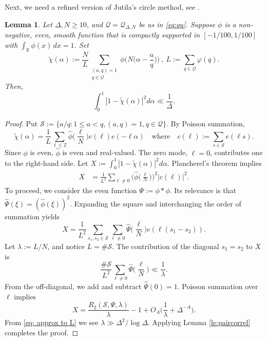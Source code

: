 \documentclass[12pt,reqno]{amsart}
\theoremstyle{plain}
\newtheorem{lemma}{Lemma}
\numberwithin{equation}{section}
\numberwithin{figure}{section}
\theoremstyle{plain}
\theoremstyle{definition}
\theoremstyle{remark}
\begin{document}
Next, we need a refined version of Jutila's circle method,
see \cite{Mayank}. 
\begin{lemma} \label{le:mayank}
  Let $\Delta, N \geq 10$, 
  and $\mathcal{Q}=\mathcal{Q}_{\Delta,N}$ be as in \eqref{eq:qu}.
  Suppose $\phi$
  is a non-negative, even, smooth function that is
  compactly supported in $[-1 / 100,1 / 100]$ with 
  $\int_{\mathbb{R}} \phi (x) \,dx = 1$. Set
  $$
  \widetilde{\chi}(\alpha) := \frac{N}{L}
  \sum_{\substack{(a,q) = 1 \\ q \in \mathcal{Q}}} 
  \phi \Big ( N 
  \Big ( \alpha - \frac{a}{q} \Big ) \Big ) \ , 
  \ L := \sum_{q \in \mathcal{Q}} \varphi(q). 
  $$
  Then,
  $$
  \int_{0}^{1} |1 - \widetilde{\chi}(\alpha)|^2 
  d \alpha 
  \ll \frac{1}{\Delta}.
  $$
\end{lemma}
\begin{proof}
Put $\mathcal{S}:=\{a/q: 
  1\leq a < q, (a,q)=1, q\in \mathcal{Q}\}$.
By Poisson summation, 
$$\widetilde{\chi}(\alpha) = 
\frac{1}{L}\sum_{\ell \in \mathbb{Z}} 
\widehat{\phi}\Big ( \frac{\ell}{N} \Big ) 
c(\ell) e( - \ell \alpha) 
\quad \mathrm{where}
\quad 
c(\ell) := \sum_{s\in \mathcal{S}} 
e ( \ell s ).
$$
Since $\phi$ is even, $\widehat{\phi}$ is even and real-valued.
The zero mode, $\ell=0$, contributes one to the right-hand side.
Let $X:=\int_{0}^{1} | 1 - \widetilde{\chi}(\alpha) |^2 
d \alpha $. Plancherel's theorem implies 
\begin{align*}
X & =  \frac{1}{L^2} 
\sum_{\ell \neq 0}  
\Big(\widehat{\phi} \Big(\frac{\ell}{N}\Big) \Big)^2
\vert c(\ell)\vert^2.
\end{align*}
To proceed, we consider the even function $\Psi:=\phi*\phi$.
Its relevance is that $\widehat{\Psi}(\xi)=(\widehat{\phi}(\xi))^2$.
Expanding the square and 
interchanging the order of summation yields 
$$
X = 
\frac{1}{L^2}  \sum_{s_1,s_2 \in \mathcal{S}} 
\sum_{\ell \neq 0}
\widehat{\Psi}\Big(\frac{\ell}{N}\Big)
e ( \ell (s_1 - s_2)). 
$$
Let $\lambda :=L/N$, and notice $L= \#\mathcal{S}$.
The contribution of the diagonal $s_1=s_2$  to $X$ is
$$
\frac{\#\mathcal{S}}{L^2}  
\sum_{\ell \neq 0}
\widehat{\Psi}\Big(\frac{\ell}{N}\Big)
\ll \frac{1}{\lambda}.
$$
From the off-diagonal, 
we add and subtract $\widehat{\Psi}(0)=1$.
Poisson summation over $\ell$ implies
\begin{equation}\label{eq X in terms of pair correl}
X = \frac{R_2(\mathcal{S},\Psi,\lambda)}{\lambda} - 1 + 
O_A\Big(\frac{1}{\lambda} + \Delta^{-A}\Big).
\end{equation}
From %
\eqref{eq: approx to L}
we see $\lambda \gg \Delta^2/\log \Delta$.
Applying Lemma \ref{le:paircorrel}
completes the proof.
\end{proof}
\end{document}
